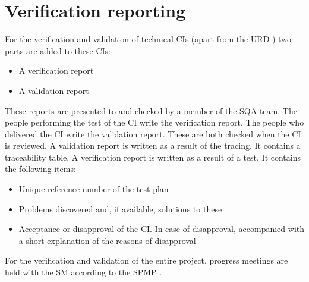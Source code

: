 \chapter{Verification reporting}
    For the verification and validation of technical CIs (apart from the URD \cite{urd}) two parts are
    added to these CIs:
\begin{itemize}
\item A verification report
\item A validation report
\end{itemize}
    These reports are presented to and checked by a member of the SQA team. The people
    performing the test of the CI write the verification report. The people who delivered the CI
    write the validation report. These are both checked when the CI is reviewed. A validation
    report is written as a result of the tracing. It contains a traceability table. A verification
    report is written as a result of a test. It contains the following items:
\begin{itemize}
\item Unique reference number of the test plan
\item Problems discovered and, if available, solutions to these
\item Acceptance or disapproval of the CI. In case of disapproval, accompanied with a short explanation of the reasons of disapproval
\end{itemize}
For the verification and validation of the entire \projectname{} project, progress meetings are held with the SM according to the SPMP \cite{spmp}.
